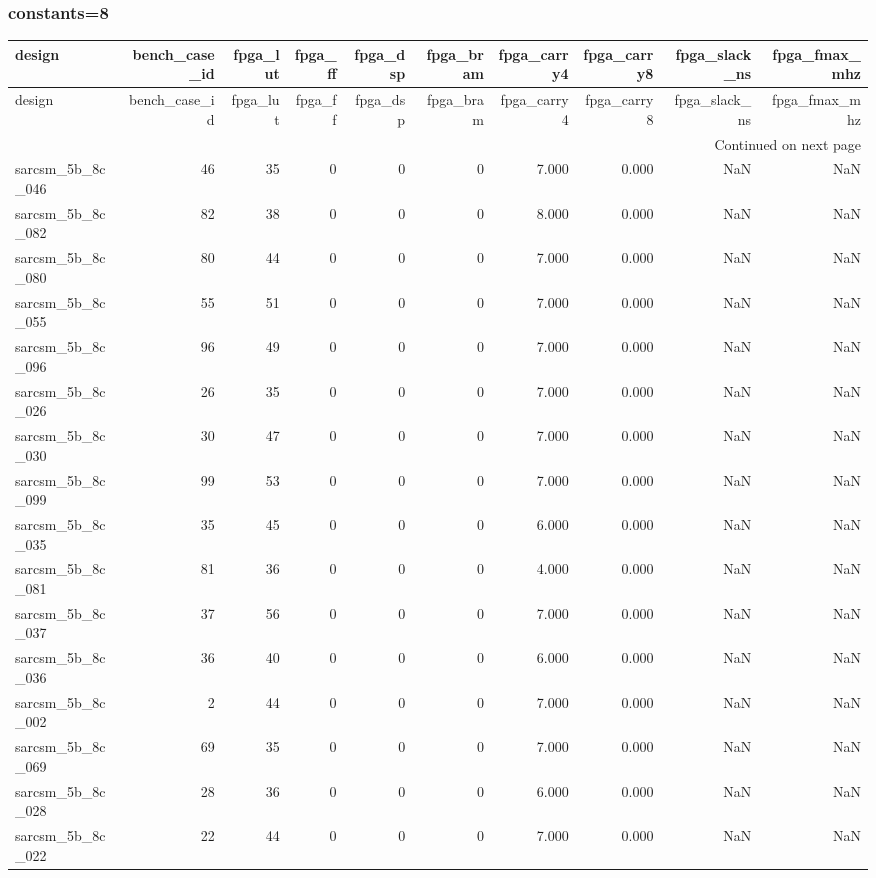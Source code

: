 \documentclass{article}
\begin{document}
\subsubsection*{constants=8}
\begin{longtable}{lrrrrrrrrr}
\toprule
design & bench\_case\_id & fpga\_lut & fpga\_ff & fpga\_dsp & fpga\_bram & fpga\_carry4 & fpga\_carry8 & fpga\_slack\_ns & fpga\_fmax\_mhz \\
\midrule
\endfirsthead
\toprule
design & bench\_case\_id & fpga\_lut & fpga\_ff & fpga\_dsp & fpga\_bram & fpga\_carry4 & fpga\_carry8 & fpga\_slack\_ns & fpga\_fmax\_mhz \\
\midrule
\endhead
\midrule
\multicolumn{10}{r}{Continued on next page} \\
\midrule
\endfoot
\bottomrule
\endlastfoot
sarcsm\_5b\_8c\_046 & 46 & 35 & 0 & 0 & 0 & 7.000 & 0.000 & NaN & NaN \\
sarcsm\_5b\_8c\_082 & 82 & 38 & 0 & 0 & 0 & 8.000 & 0.000 & NaN & NaN \\
sarcsm\_5b\_8c\_080 & 80 & 44 & 0 & 0 & 0 & 7.000 & 0.000 & NaN & NaN \\
sarcsm\_5b\_8c\_055 & 55 & 51 & 0 & 0 & 0 & 7.000 & 0.000 & NaN & NaN \\
sarcsm\_5b\_8c\_096 & 96 & 49 & 0 & 0 & 0 & 7.000 & 0.000 & NaN & NaN \\
sarcsm\_5b\_8c\_026 & 26 & 35 & 0 & 0 & 0 & 7.000 & 0.000 & NaN & NaN \\
sarcsm\_5b\_8c\_030 & 30 & 47 & 0 & 0 & 0 & 7.000 & 0.000 & NaN & NaN \\
sarcsm\_5b\_8c\_099 & 99 & 53 & 0 & 0 & 0 & 7.000 & 0.000 & NaN & NaN \\
sarcsm\_5b\_8c\_035 & 35 & 45 & 0 & 0 & 0 & 6.000 & 0.000 & NaN & NaN \\
sarcsm\_5b\_8c\_081 & 81 & 36 & 0 & 0 & 0 & 4.000 & 0.000 & NaN & NaN \\
sarcsm\_5b\_8c\_037 & 37 & 56 & 0 & 0 & 0 & 7.000 & 0.000 & NaN & NaN \\
sarcsm\_5b\_8c\_036 & 36 & 40 & 0 & 0 & 0 & 6.000 & 0.000 & NaN & NaN \\
sarcsm\_5b\_8c\_002 & 2 & 44 & 0 & 0 & 0 & 7.000 & 0.000 & NaN & NaN \\
sarcsm\_5b\_8c\_069 & 69 & 35 & 0 & 0 & 0 & 7.000 & 0.000 & NaN & NaN \\
sarcsm\_5b\_8c\_028 & 28 & 36 & 0 & 0 & 0 & 6.000 & 0.000 & NaN & NaN \\
sarcsm\_5b\_8c\_022 & 22 & 44 & 0 & 0 & 0 & 7.000 & 0.000 & NaN & NaN \\

\end{longtable}
\end{document}
